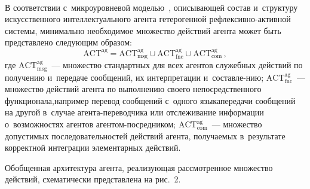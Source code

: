 \begin{multicols}{2}
\begin{figure*} %
\vspace*{1pt}
  \begin{center}
 \mbox{%
 \epsfxsize=146.816mm 
 }
\end{center}
\vspace*{-9pt}
\end{figure*}
  
  В соответствии с~микроуровневой моделью~\cite{2-lis}, описывающей со\-став 
и~структуру искусственного интеллектуального агента гетерогенной  
реф\-лек\-сив\-но-ак\-тив\-ной сис\-те\-мы, минимально необходимое 
множество действий агента может быть пред\-став\-ле\-но сле\-ду\-ющим образом:
  \begin{equation*}
  \mathrm{ACT}^{\mathrm{ag}} =\mathrm{ACT}_{\mathrm{msg}}^{\mathrm{ag}}\cup 
  \mathrm{ACT}_{\mathrm{fnc}}^{\mathrm{ag}} \cup 
\mathrm{ACT}_{\mathrm{com}}^{\mathrm{ag}}\,,
  \end{equation*}
    где $\mathrm{ACT}_{\mathrm{msg}}^{\mathrm{ag}}$~--- множество стандартных для 
всех агентов служебных действий по получению и~передаче сообщений, их 
интерпретации и~со\-став\-ле-\linebreak нию; $\mathrm{ACT}_{\mathrm{fnc}}^{\mathrm{ag}}$~--- 
множество действий агента по выполнению своего непосредственного 
функционала,\linebreak например перевод сообщений с~одного языка\linebreak передачи 
сообщений на другой в~случае аген\-та-пе\-ре\-вод\-чи\-ка или отслеживание 
информации о~возможностях агентов аген\-том-по\-сред\-ни\-ком; 
$\mathrm{ACT}_{\mathrm{com}}^{\mathrm{ag}}$~--- множество допустимых 
последовательностей действий агента, по\-лу\-ча\-емых в~результате корректной 
интеграции элементарных действий.
  
  Обобщенная архитектура агента, реализующая рас\-смот\-рен\-ное множество 
действий, схематически пред\-став\-ле\-на на рис.~2. 
  

\end{multicols}

